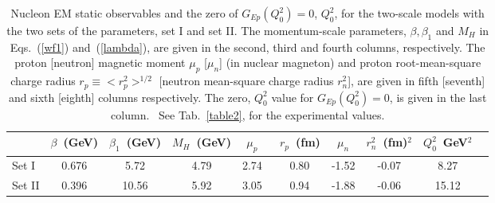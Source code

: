 \documentclass[preprint,aps,showpacs,floatfix]{revtex4}
\begin{document}
\begin{table}[htbp]
\caption{Nucleon EM static observables and the zero of
$G_{Ep}(Q^2_0) = 0$, $Q^2_0$, for the two-scale models with the two sets of the parameters, 
set I and set II. The momentum-scale parameters, $\beta, \beta_1$ and $M_H$ 
in Eqs.~(\ref{wf1}) and~(\ref{lambda}), are given in the second, third and fourth
columns, respectively. The proton [neutron] magnetic moment $\mu_p$ [$\mu_n$] 
(in nuclear magneton) and proton root-mean-square charge radius $r_p \equiv <r^2_p>^{1/2}$ 
[neutron mean-square charge radius $r^2_n$], 
are given in fifth [seventh] and sixth [eighth] columns respectively. 
The zero, $Q^2_0$ value for $G_{Ep}(Q^2_0) = 0$, 
is given in the last column.
~See Tab.~\ref{table2}, for the experimental values.
\label{tab1}
}
\begin{center}
\begin{tabular}{|l|c|c|c|c|c|c|c|c|c|}
\hline 
\hline
 & $\beta$~(GeV) & $\beta_1$~(GeV) & $M_{H}$~(GeV) &$\mu_p$ &~$r_p$~(fm) & $\mu_n$&
$r^2_n$~(fm)$^2$ & $Q_0^2$~GeV$^2$ \\
\hline
Set I & 0.676   & 5.72 & 4.79  & 2.74   &~0.80  & -1.52 & -0.07 & 8.27  \\
Set II & 0.396    & 10.56 &5.92  & 3.05 &~0.94  & -1.88 & -0.06 & 15.12  \\
\hline
\hline 
\end{tabular}
\end{center}
\end{table}
\end{document}
